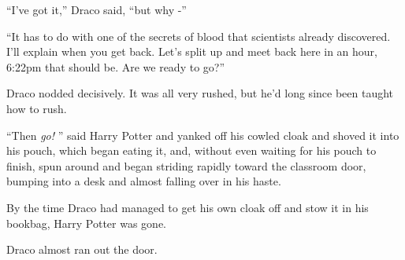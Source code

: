 ``I've got it,'' Draco said, ``but why -''

``It has to do with one of the secrets of blood that scientists already
discovered. I'll explain when you get back. Let's split up and meet back
here in an hour, 6:22pm that should be. Are we ready to go?''

Draco nodded decisively. It was all very rushed, but he'd long since
been taught how to rush.

``Then \emph{go!} '' said Harry Potter and yanked off his cowled cloak and
shoved it into his pouch, which began eating it, and, without even
waiting for his pouch to finish, spun around and began striding rapidly
toward the classroom door, bumping into a desk and almost falling over
in his haste.

By the time Draco had managed to get his own cloak off and stow it in
his bookbag, Harry Potter was gone.

Draco almost ran out the door.
